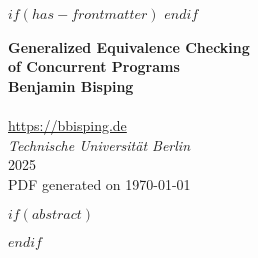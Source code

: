 $if(has-frontmatter)$
\frontmatter
$endif$
%
\makeatletter
  \let\ps@plain\ps@empty
\makeatother
\setlength{\headheight}{15pt}
\addtolength{\headwidth}{\marginparwidth}
\fancyhf{}
\fancyhead[LO]{\nouppercase{\rightmark}}
\fancyhead[RO]{\thepage}
\fancyhead[LE]{\thepage}
\fancyhead[RE]{\nouppercase{\leftmark}}
\renewcommand{\headrulewidth}{0pt}
\pagestyle{fancy}
\begin{titlepage}
    \begin{center}
        {\huge\bfseries Generalized Equivalence Checking \\ of Concurrent Programs\\}
        \vspace{1.5cm}
        \vfill
        {\Large\bfseries Benjamin Bisping}\\
        \\[5pt]
        \url{https://bbisping.de}\\[14pt]
        \vspace{2cm}
        \emph{{Technische Universität Berlin}}\\[2cm]
        \vfill
        {2025}\\
        \vspace{1cm}
        {\small PDF generated on \today}
    \end{center}
\end{titlepage}
\restoregeometry
%
$if(abstract)$
\begin{abstract}
$abstract$
\end{abstract}
$endif$